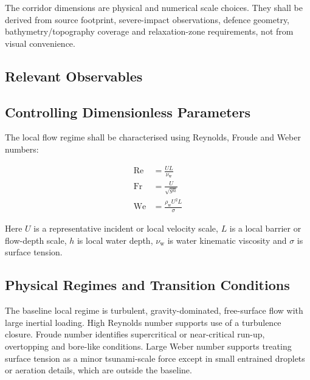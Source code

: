 The corridor dimensions are physical and numerical scale choices. They
shall be derived from source footprint, severe-impact observations,
defence geometry, bathymetry/topography coverage and relaxation-zone
requirements, not from visual convenience.

\subsection{Relevant Observables}
\label{sec:res-phy-scl-relevant-observables}


\subsection{Controlling Dimensionless Parameters}
\label{sec:res-phy-scl-controlling-dimensionless-parameters}


The local flow regime shall be characterised using Reynolds, Froude and
Weber numbers:

\begin{align}
  \mathrm{Re}
  &=
  \frac{
    U L
  }{
    \nu_{\mathrm{w}}
  }
  \label{eq:res-phy-scl-reynolds-number}
  \\
  \mathrm{Fr}
  &=
  \frac{
    U
  }{
    \sqrt{
      g h
    }
  }
  \label{eq:res-phy-scl-froude-number}
  \\
  \mathrm{We}
  &=
  \frac{
    \rho_{\mathrm{w}} U^2 L
  }{
    \sigma
  }
  \label{eq:res-phy-scl-weber-number}
\end{align}

Here $U$ is a representative incident or local velocity scale, $L$ is a
local barrier or flow-depth scale, $h$ is local water depth,
$\nu_{\mathrm{w}}$ is water kinematic viscosity and $\sigma$ is
surface tension.

\subsection{Physical Regimes and Transition Conditions}
\label{sec:res-phy-scl-physical-regimes-transition-conditions}


The baseline local regime is turbulent, gravity-dominated,
free-surface flow with large inertial loading. High Reynolds number
supports use of a turbulence closure. Froude number identifies
supercritical or near-critical run-up, overtopping and bore-like
conditions. Large Weber number supports treating surface tension as a
minor tsunami-scale force except in small entrained droplets or
aeration details, which are outside the baseline.

